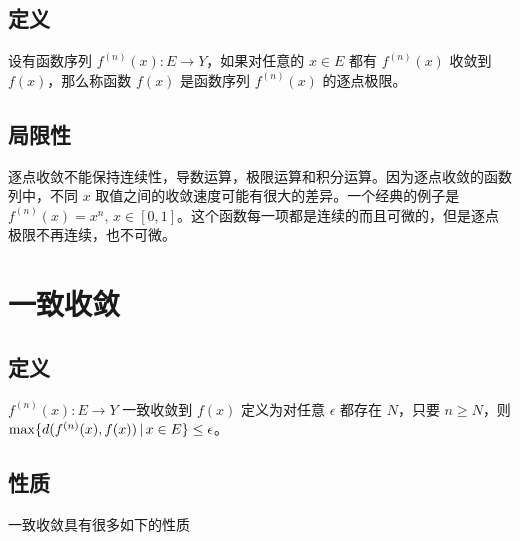 \subsection{定义}

设有函数序列 $f^{(n)}(x): E \to Y$，如果对任意的 $x \in E$ 都有 $f^{(n)}(x)$ 收敛到 $f(x)$，那么称函数 $f(x)$ 是函数序列 $f^{(n)}(x)$ 的逐点极限。

\subsection{局限性}

逐点收敛不能保持连续性，导数运算，极限运算和积分运算。因为逐点收敛的函数列中，不同 $x$ 取值之间的收敛速度可能有很大的差异。一个经典的例子是 $f^{(n)}(x) = x^n, \, x \in [0,1]$。这个函数每一项都是连续的而且可微的，但是逐点极限不再连续，也不可微。

\section{一致收敛}

\subsection{定义}

$f^{(n)}(x): E \to Y$ 一致收敛到 $f(x)$ 定义为对任意 $\epsilon$ 都存在 $N$，只要 $n \ge N$，则 $\max \{ d( f^{(n)}(x), f(x)) \,\vert\, x \in E \} \le \epsilon$。

\subsection{性质}

一致收敛具有很多如下的性质

